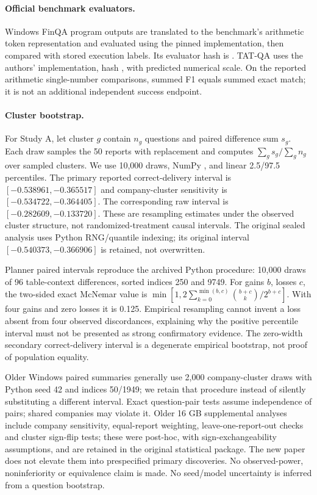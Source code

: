 \documentclass[letterpaper]{article}
\begin{document}
\paragraph{Official benchmark evaluators.}
Windows FinQA program outputs are translated to the benchmark's arithmetic token representation and evaluated using the pinned implementation, then compared with stored execution labels. Its evaluator hash is \texttt{}. TAT-QA uses the authors'  implementation, hash \texttt{}, with predicted numerical scale. On the reported arithmetic single-number comparisons, summed F1 equals summed exact match; it is not an additional independent success endpoint.

\paragraph{Cluster bootstrap.}
For Study A, let cluster $g$ contain $n_g$ questions and paired difference sum $s_g$. Each draw samples the 50 reports with replacement and computes $\sum_g s_g/\sum_g n_g$ over sampled clusters. We use 10,000 draws, NumPy , and linear 2.5/97.5 percentiles. The primary reported correct-delivery interval is $[-0.538961,-0.365517]$ and company-cluster sensitivity is $[-0.534722,-0.364405]$. The corresponding raw interval is $[-0.282609,-0.133720]$. These are resampling estimates under the observed cluster structure, not randomized-treatment causal intervals. The original sealed analysis uses Python RNG/quantile indexing; its original interval $[-0.540373,-0.366906]$ is retained, not overwritten.

Planner paired intervals reproduce the archived Python  procedure: 10,000 draws of 96 table-context differences, sorted indices 250 and 9749. For gains $b$, losses $c$, the two-sided exact McNemar value is $\min[1,2\sum_{k=0}^{\min(b,c)}\binom{b+c}{k}/2^{b+c}]$. With four gains and zero losses it is 0.125. Empirical resampling cannot invent a loss absent from four observed discordances, explaining why the positive percentile interval must not be presented as strong confirmatory evidence. The zero-width secondary correct-delivery interval is a degenerate empirical bootstrap, not proof of population equality.

Older Windows paired summaries generally use 2,000 company-cluster draws with Python seed 42 and indices 50/1949; we retain that procedure instead of silently substituting a different interval. Exact question-pair tests assume independence of pairs; shared companies may violate it. Older 16 GB supplemental analyses include company sensitivity, equal-report weighting, leave-one-report-out checks and cluster sign-flip tests; these were post-hoc, with sign-exchangeability assumptions, and are retained in the original statistical package. The new paper does not elevate them into prespecified primary discoveries. No observed-power, noninferiority or equivalence claim is made. No seed/model uncertainty is inferred from a question bootstrap.
\end{document}
